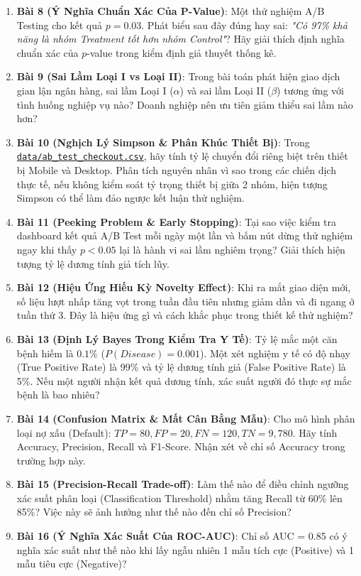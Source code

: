 \begin{baitapbox}
\begin{enumerate}
    \item \textbf{Bài 8 (Ý Nghĩa Chuẩn Xác Của P-Value)}: Một thử nghiệm A/B Testing cho kết quả $p = 0.03$. Phát biểu sau đây đúng hay sai: \textit{"Có 97\% khả năng là nhóm Treatment tốt hơn nhóm Control"}? Hãy giải thích định nghĩa chuẩn xác của $p$-value trong kiểm định giả thuyết thống kê.
    \item \textbf{Bài 9 (Sai Lầm Loại I vs Loại II)}: Trong bài toán phát hiện giao dịch gian lận ngân hàng, sai lầm Loại I ($\alpha$) và sai lầm Loại II ($\beta$) tương ứng với tình huống nghiệp vụ nào? Doanh nghiệp nên ưu tiên giảm thiểu sai lầm nào hơn?
    \item \textbf{Bài 10 (Nghịch Lý Simpson \& Phân Khúc Thiết Bị)}: Trong \href{run:./data/ab_test_checkout.csv}{\texttt{data/ab\_test\_checkout.csv}}, hãy tính tỷ lệ chuyển đổi riêng biệt trên thiết bị Mobile và Desktop. Phân tích nguyên nhân vì sao trong các chiến dịch thực tế, nếu không kiểm soát tỷ trọng thiết bị giữa 2 nhóm, hiện tượng Simpson có thể làm đảo ngược kết luận thử nghiệm.
    \item \textbf{Bài 11 (Peeking Problem \& Early Stopping)}: Tại sao việc kiểm tra dashboard kết quả A/B Test mỗi ngày một lần và bấm nút dừng thử nghiệm ngay khi thấy $p < 0.05$ lại là hành vi sai lầm nghiêm trọng? Giải thích hiện tượng tỷ lệ dương tính giả tích lũy.
    \item \textbf{Bài 12 (Hiệu Ứng Hiếu Kỳ Novelty Effect)}: Khi ra mắt giao diện mới, số liệu lượt nhấp tăng vọt trong tuần đầu tiên nhưng giảm dần và đi ngang ở tuần thứ 3. Đây là hiệu ứng gì và cách khắc phục trong thiết kế thử nghiệm?
    \item \textbf{Bài 13 (Định Lý Bayes Trong Kiểm Tra Y Tế)}: Tỷ lệ mắc một căn bệnh hiếm là $0.1\%$ ($P(Disease) = 0.001$). Một xét nghiệm y tế có độ nhạy (True Positive Rate) là 99\% và tỷ lệ dương tính giả (False Positive Rate) là 5\%. Nếu một người nhận kết quả dương tính, xác suất người đó thực sự mắc bệnh là bao nhiêu?
    \item \textbf{Bài 14 (Confusion Matrix \& Mất Cân Bằng Mẫu)}: Cho mô hình phân loại nợ xấu (Default): $TP = 80, FP = 20, FN = 120, TN = 9,780$. Hãy tính Accuracy, Precision, Recall và F1-Score. Nhận xét về chỉ số Accuracy trong trường hợp này.
    \item \textbf{Bài 15 (Precision-Recall Trade-off)}: Làm thế nào để điều chỉnh ngưỡng xác suất phân loại (Classification Threshold) nhằm tăng Recall từ 60\% lên 85\%? Việc này sẽ ảnh hưởng như thế nào đến chỉ số Precision?
    \item \textbf{Bài 16 (Ý Nghĩa Xác Suất Của ROC-AUC)}: Chỉ số AUC = 0.85 có ý nghĩa xác suất như thế nào khi lấy ngẫu nhiên 1 mẫu tích cực (Positive) và 1 mẫu tiêu cực (Negative)?

\end{enumerate}
\end{baitapbox}

